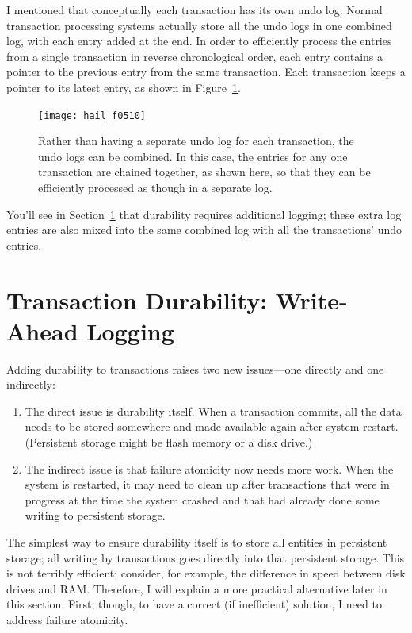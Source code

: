 I mentioned that conceptually each transaction has its own undo log.
Normal transaction processing systems actually store all the undo logs
in one combined log, with each entry added at the end.  In order to
efficiently process the entries from a single transaction in reverse
chronological order, each entry contains a pointer to the previous
entry from the same transaction.  Each transaction keeps a
pointer to its latest entry, as shown in Figure~\ref{scan-5-11}.
\begin{figure}
\centerline{\texttt{[image: hail\_f0510]}}
\caption{Rather than having a separate undo log for each transaction,
  the undo logs can be combined.  In this case, the entries for any one
  transaction are chained together, as shown here, so that they can be
  efficiently processed as though in a separate log.}
\label{scan-5-11}
\end{figure}
You'll see in Section~\ref{wal} that
durability requires additional logging; these extra log entries are
also mixed into the same combined log with all the transactions' undo
entries.

\section{Transaction Durability: Write-Ahead Logging}
\label{wal}

Adding durability to transactions raises two new issues---one directly and
one indirectly:
\begin{enumerate}
\item
The direct issue is durability itself.  When a transaction commits,
all the data needs to be stored somewhere  and made
available again after system restart.  (Persistent storage might be
flash memory or a disk drive.)
\item
The indirect issue is that failure atomicity now needs more work.
When the system is restarted, it may need to clean up after
transactions that were in progress at the time the system crashed and
that had already done some writing to persistent storage.
\end{enumerate}

The simplest way to ensure durability itself is to store all entities
in persistent storage; all writing by transactions goes directly into
that persistent storage.  This is not terribly efficient; consider,
for example, the difference in speed between disk drives and RAM.
Therefore, I will explain a more practical alternative later in this section.  First,
though, to have a correct (if inefficient) solution, I need to
address failure atomicity.


